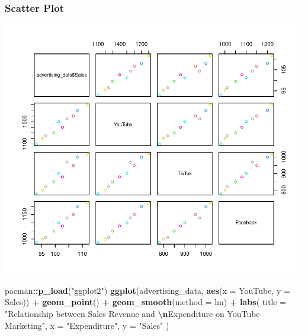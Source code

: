\documentclass[
]{article}
\newenvironment{Shaded}{\begin{snugshade}}{\end{snugshade}}
\newcommand{\AttributeTok}[1]{\textcolor[rgb]{0.13,0.29,0.53}{#1}}
\newcommand{\FunctionTok}[1]{\textcolor[rgb]{0.13,0.29,0.53}{\textbf{#1}}}
\newcommand{\NormalTok}[1]{#1}
\newcommand{\SpecialCharTok}[1]{\textcolor[rgb]{0.81,0.36,0.00}{\textbf{#1}}}
\newcommand{\StringTok}[1]{\textcolor[rgb]{0.31,0.60,0.02}{#1}}
\begin{document}
\subsubsection{\texorpdfstring{\textbf{Scatter
Plot}}{Scatter Plot}}\label{scatter-plot}

\begin{Shaded}
\end{Shaded}

\includegraphics{2_multiple_linear_regression_files/figure-latex/scatter_plot_1-1.pdf}

\begin{Shaded}
\begin{Highlighting}[]
\NormalTok{pacman}\SpecialCharTok{::}\FunctionTok{p\_load}\NormalTok{(}\StringTok{"ggplot2"}\NormalTok{)}
\FunctionTok{ggplot}\NormalTok{(advertising\_data,}
       \FunctionTok{aes}\NormalTok{(}\AttributeTok{x =}\NormalTok{ YouTube, }\AttributeTok{y =}\NormalTok{ Sales)) }\SpecialCharTok{+} 
  \FunctionTok{geom\_point}\NormalTok{() }\SpecialCharTok{+}
  \FunctionTok{geom\_smooth}\NormalTok{(}\AttributeTok{method =}\NormalTok{ lm) }\SpecialCharTok{+}
  \FunctionTok{labs}\NormalTok{(}
    \AttributeTok{title =} \StringTok{"Relationship between Sales Revenue and }\SpecialCharTok{\textbackslash{}n}\StringTok{Expenditure on YouTube Marketing"}\NormalTok{,}
    \AttributeTok{x =} \StringTok{"Expenditure"}\NormalTok{,}
    \AttributeTok{y =} \StringTok{"Sales"}
\NormalTok{  )}
\end{Highlighting}
\end{Shaded}
\end{document}
